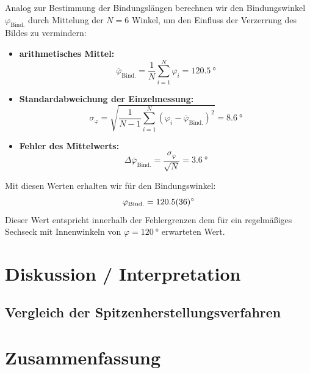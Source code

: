 \documentclass[10pt, a4paper]{article}
\begin{document}


Analog zur Bestimmung der Bindungslängen berechnen wir den Bindungswinkel $\varphi_\mathrm{Bind.}$ durch Mittelung der $N = 6$ Winkel, um den Einfluss der Verzerrung des Bildes zu vermindern:
\begin{itemize}
  \item \textbf{arithmetisches Mittel:}
  \begin{equation}
    \bar{\varphi}_\mathrm{Bind.} = \frac{1}{N} \sum_{i=1}^N \varphi_i = \SI{120,5}{\degree}
  \end{equation}
  
  \item \textbf{Standardabweichung der Einzelmessung:}
  \begin{equation}
    \sigma_\mathrm{\varphi} = \sqrt{\frac{1}{N-1} \sum_{i=1}^N (\varphi_i - \bar{\varphi}_\mathrm{Bind.})^2} = \SI{8,6}{\degree}
  \end{equation}
  
  \item \textbf{Fehler des Mittelwerts:}
  \begin{equation}
    \Delta \bar{\varphi}_\mathrm{Bind.} = \frac{\sigma_\mathrm{\varphi}}{\sqrt{N}} = \SI{3,6}{\degree}
  \end{equation}
\end{itemize}
Mit diesen Werten erhalten wir für den Bindungswinkel:
\begin{equation*}
  \varphi_\mathrm{Bind.} = \SI{120,5 +- 3,6}{\degree}
\end{equation*}
Dieser Wert entspricht innerhalb der Fehlergrenzen dem für ein regelmäßiges Sechseck mit Innenwinkeln von $\varphi = \SI{120}{\degree}$ erwarteten Wert.


\section{Diskussion / Interpretation}
\label{sec:Diskussion}

\subsection{Vergleich der Spitzenherstellungsverfahren}

\section{Zusammenfassung}

\end{document}
